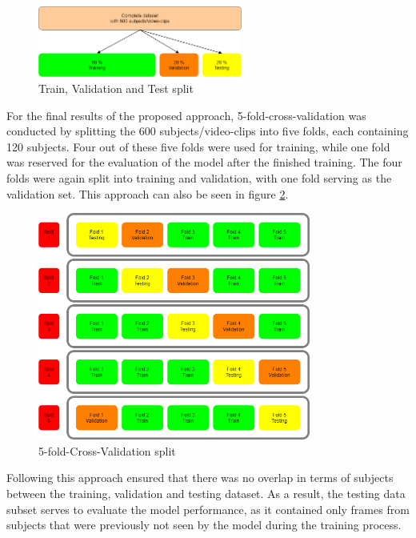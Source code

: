 \begin{figure}[H]
  \begin{center}
  \includegraphics[angle=0, width=0.6\textwidth]{Figures/TrainTest_Split.png}
  \caption{Train, Validation and Test split}
  \label{fig:TrainTestSplit}
  \end{center}
\end{figure}

For the final results of the proposed approach, 5-fold-cross-validation was conducted by splitting the 600 subjects/video-clips into five folds, each containing 120 subjects. Four out of these five folds were used for training, while one fold was reserved for the evaluation of the model after the finished training. The four folds were again split into training and validation, with one fold serving as the validation set. This approach can also be seen in figure \ref{fig:CrossValidationSplit}.

\begin{figure}[H]
  \begin{center}
  \includegraphics[angle=0, width=0.8\textwidth]{Figures/CrossValidation_Split.png}
  \caption{5-fold-Cross-Validation split}
  \label{fig:CrossValidationSplit}
  \end{center}
\end{figure}

Following this approach ensured that there was no overlap in terms of subjects between the training, validation and testing dataset. As a result, the testing data subset serves to evaluate the model performance, as it contained only frames from subjects that were previously not seen by the model during the training process.

